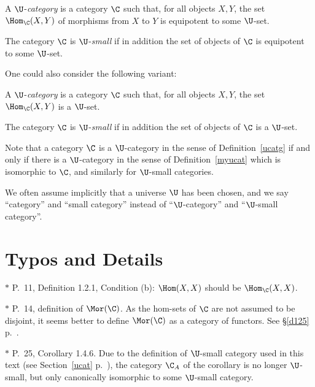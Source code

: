 \documentclass[12pt]{article}
\theoremstyle{remark}
\theoremstyle{definition}
\begin{document}
\begin{df}[$\U$-category] 
A $\U$-{\em category} is a category $\C$ such that, for all objects $X,Y$, the set $\Hom_\C(X,Y)$ of morphisms from $X$ to $Y$ is equipotent to some $\U$-set. 
\end{df} 

\begin{df} 
The category $\C$ is $\U$-{\em small} if in addition the set of objects of $\C$ is equipotent to some $\U$-set. 
\end{df} 

One could also consider the following variant: 

\begin{df}[$\U$-category] 
A $\U$-{\em category} is a category $\C$ such that, for all objects $X,Y$, the set $\Hom_\C(X,Y)$ is a $\U$-set. 
\end{df} 

\begin{df}
The category $\C$ is $\U$-{\em small} if in addition the set of objects of $\C$ is a $\U$-set. 
\end{df} 

Note that a category $\C$ is a $\U$-category in the sense of Definition~\ref{ucatg} if and only if there is a $\U$-category in the sense of Definition~\ref{myucat} which is isomorphic to $\C$, and similarly for $\U$-small categories. 
\begin{center}
\end{center}

We often assume implicitly that a universe $\U$ has been chosen, and we say ``category'' and ``small category'' instead of ``$\U$-category'' and ``$\U$-small category''.


\section{Typos and Details}

$*$ P.~11, Definition 1.2.1, Condition (b): $\Hom(X,X)$ should be $\Hom_{\C}(X,X)$. 

\nn$*$ P.~14, definition of $\Mor(\C)$. As the hom-sets of $\C$ are not assumed to be disjoint, it seems better to define $\Mor(\C)$ as a category of functors. See \S\ref{d125} p.~. 

\nn$*$ P.~25, Corollary 1.4.6. Due to the definition of $\U$-small category used in this text (see Section~\ref{ucat} p.~), the category $\C_A$ of the corollary is no longer $\U$-small, but only canonically isomorphic to some $\U$-small category. 
\end{document}
